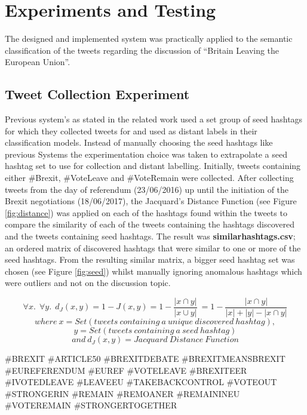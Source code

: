 \documentclass[11pt]{report}
\begin{document}
\chapter{Experiments and Testing}

The designed and implemented system was practically applied to the semantic classification of the tweets regarding the discussion of  ``Britain Leaving the European Union''.
\\

\section{Tweet Collection Experiment}
Previous system's as stated in the related work used a set group of seed hashtags for which they collected tweets for and used as distant labels in their classification models. Instead of manually choosing the seed hashtags like previous Systems the experimentation choice was taken to extrapolate a seed hashtag set to use for collection and distant labelling. Initially, tweets containing either \#Brexit, \#VoteLeave and \#VoteRemain were collected. After collecting tweets from the day of referendum (23/06/2016) up until the initiation of the Brexit negotiations (18/06/2017), the Jacquard's Distance Function (see Figure \ref{fig:distance}) was applied on each of the hashtags found within the tweets to compare the similarity of each of the tweets containing the hashtags discovered and the tweets containing seed hashtags. The result was \textbf{similar\textunderscore hashtags.csv}; an ordered matrix of discovered hashtags that were similar to one or more of the seed hashtags. From the resulting similar  matrix, a bigger seed hashtag set was chosen (see Figure \ref{fig:seed}) whilst manually ignoring anomalous hashtags which were outliers and not on the discussion topic. 

\begin{center}
\[\forall x. \:\: \forall y. \:\: d_J(x, y)=1 - J(x,y) = 1 - \frac{|x \cap y|}{|x \cup y|}\ = 1 - \frac{|x \cap y|}{|x| + |y| - |x \cap y|}\]
\[where\:x = Set(tweets\:containing\:a\:unique\:discovered\:hashtag),\] 
\[y = Set(tweets\:containing\:a\:seed\:hashtag)\] 
\[and\:d_J(x, y) = Jacquard\:Distance\:Function\]
\label{fig:distance}
\end{center}
\vspace{0.5cm}

\begin{center}
\#BREXIT \#ARTICLE50 \#BREXITDEBATE
                    \#BREXITMEANSBREXIT \#EUREFERENDUM \#EUREF
                    \#VOTELEAVE \#BREXITEER \#IVOTEDLEAVE \#LEAVEEU
                  \#TAKEBACKCONTROL \#VOTEOUT
				\#STRONGERIN \#REMAIN \#REMOANER \#REMAININEU
                  \#VOTEREMAIN \#STRONGERTOGETHER
\label{fig:seed}
\end{center}
\clearpage
\end{document}
